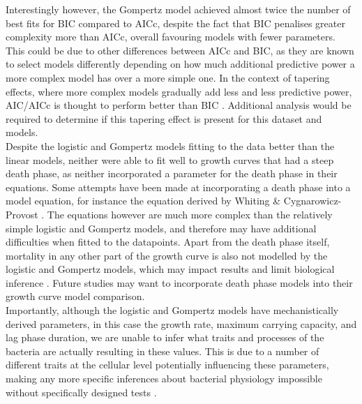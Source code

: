 \documentclass[11pt, letterpaper]{article}
\begin{document}
\noindent Interestingly however, the Gompertz model achieved almost twice the number of best fits for BIC compared to AICc, despite the fact that BIC penalises greater complexity more than AICc, overall favouring models with fewer parameters. This could be due to other differences between AICc and BIC, as they are known to select models differently depending on how much additional predictive power a more complex model has over a more simple one. In the context of tapering effects, where more complex models gradually add less and less predictive power, AIC/AICc is thought to perform better than BIC \citep{burnham&Anderson_2004}. Additional analysis would be required to determine if this tapering effect is present for this dataset and models. \\

\noindent Despite the logistic and Gompertz models fitting to the data better than the linear models, neither were able to fit well to growth curves that had a steep death phase, as neither incorporated a parameter for the death phase in their equations. Some attempts have been made at incorporating a death phase into a model equation, for instance the equation derived by Whiting \& Cygnarowicz-Provost \citeyearpar{whiting_quantitative_1992}. The equations however are much more complex than the relatively simple logistic and Gompertz models, and therefore may have additional difficulties when fitted to the datapoints. Apart from the death phase itself, mortality in any other part of the growth curve is also not modelled by the logistic and Gompertz models, which may impact results and limit biological inference \citep{peleg_microbial_2011}. Future studies may want to incorporate death phase models into their growth curve model comparison. \\

\noindent Importantly, although the logistic and Gompertz models have mechanistically derived parameters, in this case the growth rate, maximum carrying capacity, and lag phase duration, we are unable to infer what traits and processes of the bacteria are actually resulting in these values. This is due to a number of different traits at the cellular level potentially influencing these parameters, making any more specific inferences about bacterial physiology impossible without specifically designed tests \citep{peleg_microbial_2011}.\\
\end{document}
